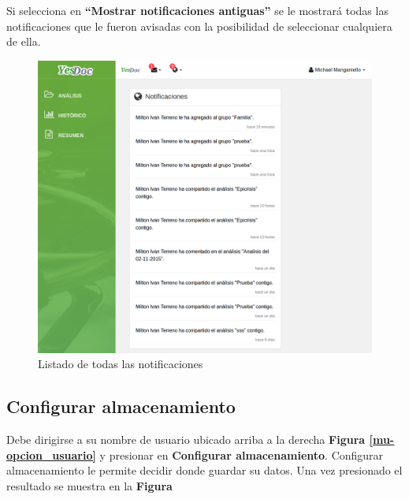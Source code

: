 \documentclass[a4paper,12pt]{article}
\begin{document}
Si selecciona en \textbf{``Mostrar notificaciones antiguas''} se le mostrará todas las notificaciones que le fueron avisadas con la posibilidad de seleccionar cualquiera de ella.

\begin{figure}
	\centering
	\includegraphics[width=.8\textwidth]{img/manual_de_usuario/lista_notificaciones}
	\caption{Listado de todas las notificaciones}
	\label{mu-lista_notificaciones}
\end{figure}

\subsection{Configurar almacenamiento}
Debe dirigirse a su nombre de usuario ubicado arriba a la derecha \textbf{Figura \ref{mu-opcion_usuario}} y presionar en \textbf{Configurar almacenamiento}. Configurar almacenamiento le permite decidir donde guardar su datos. Una vez presionado el resultado se muestra en la \textbf{Figura}
\end{document}
